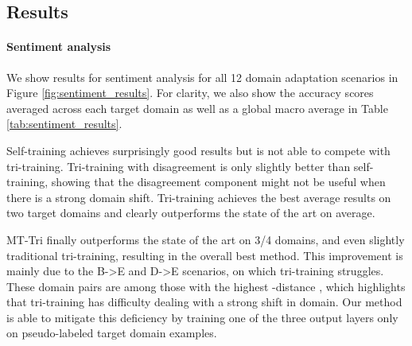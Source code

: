 \documentclass[11pt,a4paper]{article}
\begin{document}
\subsection{Results} \label{sec:results}

\paragraph{Sentiment analysis} We show results for sentiment analysis for all 12 domain adaptation scenarios in Figure \ref{fig:sentiment_results}. For clarity, we also show the accuracy scores averaged across each target domain as well as a global macro average in Table \ref{tab:sentiment_results}.
\begin{table}[ht!]
\centering
{}
\caption{Average accuracy scores for each SA target domain. *: result from .}
\label{tab:sentiment_results}
\end{table}




Self-training achieves surprisingly good results but is not able to compete with tri-training. Tri-training with disagreement is only slightly better than self-training, showing that the disagreement component might not be useful when there is a strong domain shift.
Tri-training achieves the best average results on two target domains and clearly outperforms the state of the art on average.

MT-Tri finally outperforms the state of the art on 3/4 domains, and even slightly traditional tri-training, resulting in the overall best method. This improvement is mainly due to the B->E and D->E scenarios, on which tri-training struggles. These domain pairs are among those with the highest -distance \cite{Blitzer2007}, which highlights that tri-training has difficulty dealing with a strong shift in domain. Our method is able to mitigate this deficiency by training one of the three output layers only on pseudo-labeled target domain examples.
\end{document}
